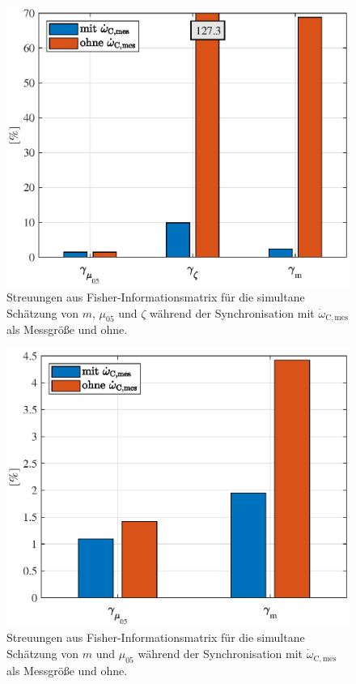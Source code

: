 \begin{figure}[ht]
  \centering
 \includegraphics[scale=0.9]{figures/03_Sensitivitaetsanalyse/03_Fisher_Info/Sync/m_mue05_zeta_Sync.eps}
  \caption{Streuungen aus Fisher-Informationsmatrix für die simultane Schätzung von $m$, $\mu_{05}$ und $\zeta$ während der Synchronisation mit $\dot{\omega}_\mathrm{C,mes}$ als Messgröße und ohne.}\label{fig:m_mue05_zeta_Sync}
\end{figure} 

\begin{figure}[ht]
  \centering
 \includegraphics[scale=0.9]{figures/03_Sensitivitaetsanalyse/03_Fisher_Info/Sync/m_mue05_Sync.eps}
  \caption{Streuungen aus Fisher-Informationsmatrix für die simultane Schätzung von $m$ und $\mu_{05}$ während der Synchronisation mit $\dot{\omega}_\mathrm{C,mes}$ als Messgröße und ohne.}
  \label{fig:m_mue05_Sync}
\end{figure}

